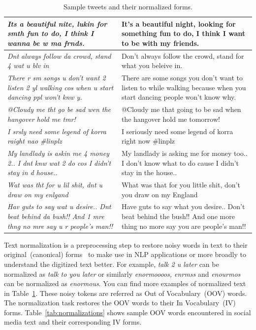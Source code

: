 \documentclass[a4paper,onesided,12pt]{report}
\begin{document}
\begin{table}[hbp]
\caption[Sample tweets and their normalized forms.]{Sample tweets and their normalized forms.}
\label{tab:sentences}
\begin{tabular}{|>{\itshape}p{7cm}|p{7cm}|}
\hline
Its a beautiful nite, lukin for smth fun to do, I think I wanna be w ma frnds. &
It’s a beautiful night, looking for something fun to do, I think I want to be with my friends. \\
\hline
Dnt always follow da crowd, stand 4 wat u blv in &
Don't always follow the crowd, stand for what you beleive in. \\
\hline
There r sm songs u don't want 2 listen 2 yl walking cos when u start dancing ppl won't knw y. &
There are some songs you don't want to listen to while walking because when you start dancing people won't know why. \\
\hline
@Cloudy me tht go be sad wen the hangover hold me tmr! &

@Cloudy me that going to be sad when the hangover hold me tomorrow! \\
\hline
I srsly need some legend of korra raight nao \#linplz &
I seriously need some legend of korra right now \#linplz \\
\hline
My landlady is askin me 4 money 2.. I dnt knw wat 2 do cos I didn't stay in d house.. &
My landlady is asking me for money too.. I don’t know what to do cause I didn't stay in the house.. \\ \hline
Wat was tht for u lil shit, dnt u draw on my enlgand &
What was that for you little shit, don’t you draw on my England \\ \hline
Hav guts to say wat u desire.. Dnt beat behind da bush!! And 1 mre thng no mre say u r people's man!! &
Have guts to say what you desire.. Don’t beat behind the bush!! And one more thing no more say you are people's man!! \\
\hline
\end{tabular}
\end{table}

Text normalization is a preprocessing step to restore noisy words in text to their original~(canonical) forms~\cite{Han:2011:LNS:2002472.2002520} to make use in NLP applications or more broadly to understand the digitized text better. For example, \textit{talk 2 u later} can be normalized as \textit{talk to you later} or similarly \textit{enormoooos, enrmss} and \textit{enourmos} can be normalized as \textit{enormous}. You can find more examples of normalized text in Table~\ref{tab:sentences}. These noisy tokens are referred as Out of Vocabulary~(OOV) words. The normalization task restores the OOV words to their In Vocabulary~(IV) forms. Table~\ref{tab:normalizations} shows sample OOV words encountered in social media text and their corresponding IV forms.
\end{document}
